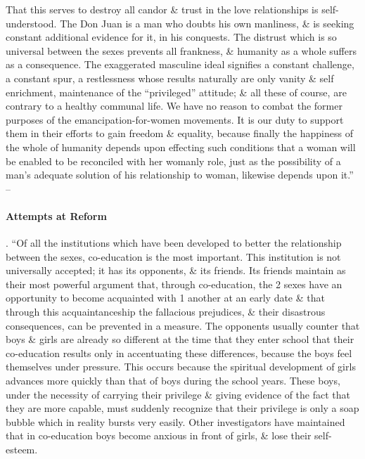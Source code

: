 \documentclass{article}
\begin{document}
That this serves to destroy all candor \& trust in the love relationships is self-understood. The Don Juan is a man who doubts his own manliness, \& is seeking constant additional evidence for it, in his conquests. The distrust which is so universal between the sexes prevents all frankness, \& humanity as a whole suffers as a consequence. The exaggerated masculine ideal signifies a constant challenge, a constant spur, a restlessness whose results naturally are only vanity \& self enrichment, maintenance of the ``privileged'' attitude; \& all these of course, are contrary to a healthy communal life. We have no reason to combat the former purposes of the emancipation-for-women movements. It is our duty to support them in their efforts to gain freedom \& equality, because finally the happiness of the whole of humanity depends upon effecting such conditions that a woman will be enabled to be reconciled with her womanly role, just as the possibility of a man's adequate solution of his relationship to woman, likewise depends upon it.'' -- \cite[pp. 145--147]{Adler_human_nature}

\paragraph{Attempts at Reform}. ``Of all the institutions which have been developed to better the relationship between the sexes, co-education is the most important. This institution is not universally accepted; it has its opponents, \& its friends. Its friends maintain as their most powerful argument that, through co-education, the 2 sexes have an opportunity to become acquainted with 1 another at an early date \& that through this acquaintanceship the fallacious prejudices, \& their disastrous consequences, can be prevented in a measure. The opponents usually counter that boys \& girls are already so different at the time that they enter school that their co-education results only in accentuating these differences, because the boys feel themselves under pressure. This occurs because the spiritual development of girls advances more quickly than that of boys during the school years. These boys, under the necessity of carrying their privilege \& giving evidence of the fact that they are more capable, must suddenly recognize that their privilege is only a soap bubble which in reality bursts very easily. Other investigators have maintained that in co-education boys become anxious in front of girls, \& lose their self-esteem.
\end{document}
